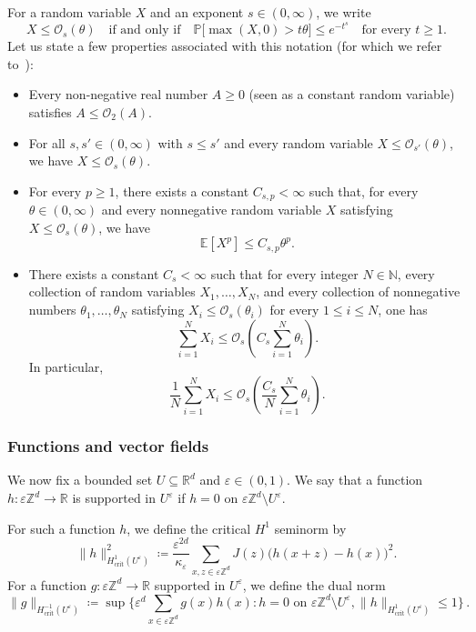 \documentclass[11pt]{amsart}
\theoremstyle{plain}
\theoremstyle{definition}
\theoremstyle{remark}
\newcommand{\E}{\mathbb{E}}
\newcommand{\Zd}{\mathbb{Z}^d}
\newcommand{\Rd}{\mathbb{R}^d}
\newcommand{\R}{\mathbb{R}}
\renewcommand{\O}{\mathcal{O}}
\newcommand{\eps}{\varepsilon}
\renewcommand{\P}{\mathbb{P}}
\begin{document}
	For a random variable $X$ and an exponent $s \in (0,\infty)$, we write 
	\[
	X \leq \O_{s}(\theta) \quad \text{if and only if} \quad \P\bigl[\max(X, 0) > t\theta\bigr] \le e^{-t^s} \quad \text{for every } t \ge 1.
	\]
	Let us state a few properties associated with this notation (for which we refer to~\cite[Appendix A]{ArmstrongKuusiMourrat2019}):
	\begin{itemize}
		\item Every non-negative real number $A \geq 0$ (seen as a constant random variable) satisfies $A \leq \mathcal{O}_2(A)$.
		\item For all $s, s' \in (0, \infty)$ with $s \leq s'$ and every random variable $X \leq \mathcal{O}_{s'}(\theta)$, we have $X \leq \mathcal{O}_{s}(\theta)$.
		\item For every $p \geq 1$, there exists a constant $C_{s,p} < \infty$ such that, for every $\theta \in (0, \infty)$ and every nonnegative random variable $X$ satisfying $X \leq \mathcal{O}_s(\theta)$, we have
		\begin{equation} \label{eq:upperboundO2norm}
			\E \left[ X^p \right] \leq C_{s,p} \theta^p.
		\end{equation}
		\item There exists a constant $C_s < \infty$ such that for every integer $N \in \mathbb{N}$, every collection of random variables $X_1 , \ldots, X_N$, and every collection of nonnegative numbers $\theta_1 , \ldots, \theta_N$ satisfying $X_i \leq \mathcal{O}_s(\theta_i)$ for every $1 \le i \le N$, one has
		\[
		\sum_{i=1}^N X_i \leq \mathcal{O}_s\left(C_s \sum_{i = 1}^N \theta_i\right).
		\]
		In particular,
		\[
		\frac{1}{N} \sum_{i=1}^N X_i \leq \mathcal{O}_s\left(\frac{C_s}{N} \sum_{i = 1}^N \theta_i\right).
		\]
	\end{itemize}
	
	\subsubsection{Functions and vector fields}
	We now fix a bounded set $U \subseteq \Rd$ and $\eps \in (0,1)$.
	We say that a function $h : \eps\Zd \to \R$ is supported in $U^\eps$ if $h = 0$ on $\eps\Zd \setminus U^\eps$.
	
	For such a function $h$, we define the critical $H^1$ seminorm by
	\begin{equation}
		\label{e.H1crit}
		\|h\|_{H^1_{\mathrm{crit}}(U^\eps)}^2
		\coloneqq \frac{\eps^{2d}}{\kappa_\eps}
		\sum_{x, z \in \eps\Zd} J(z)\bigl(h(x{+}z) - h(x)\bigr)^2.
	\end{equation}
	For a function $g \colon \eps\Zd \to \R$ supported in $U^\eps$, we define the dual norm
	\begin{equation}
		\label{e.Hm1crit}
		\|g\|_{H^{-1}_{\mathrm{crit}}(U^\eps)}
		\coloneqq \sup\biggl\{\eps^d \sum_{x \in \eps\Zd} g(x) h(x)
		: h = 0 \text{ on } \eps\Zd \setminus U^\eps,
		\|h\|_{H^1_{\mathrm{crit}}(U^\eps)} \le 1\biggr\}\,.
	\end{equation}
	
\end{document}
